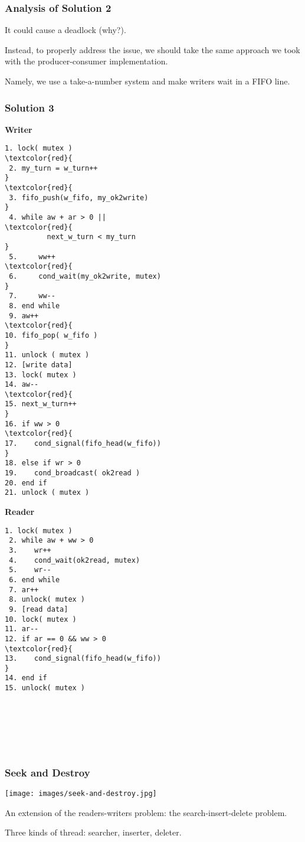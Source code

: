 \begin{frame}
	\frametitle{Analysis of Solution 2}

	It could cause a deadlock (why?).


	Instead, to properly address the issue, we should take the same approach we took with the producer-consumer implementation.

	Namely, we use a \alert{take-a-number} system and make writers wait in a FIFO line.

\end{frame}

\begin{frame}[fragile]
	\frametitle{Solution 3}

	\begin{multicols}{2}
		\footnotesize
		\textbf{Writer}
		\begin{Verbatim}[commandchars=\\\{\}]
 1. lock( mutex )
\textcolor{red}{
 2. my_turn = w_turn++
}
\textcolor{red}{
 3. fifo_push(w_fifo, my_ok2write)
}
 4. while aw + ar > 0 ||
\textcolor{red}{
          next_w_turn < my_turn
}
 5.     ww++
\textcolor{red}{
 6.     cond_wait(my_ok2write, mutex)
}
 7.     ww--
 8. end while
 9. aw++
\textcolor{red}{
10. fifo_pop( w_fifo )
}
11. unlock ( mutex )
12. [write data]
13. lock( mutex )
14. aw--
\textcolor{red}{
15. next_w_turn++
}
16. if ww > 0
\textcolor{red}{
17.    cond_signal(fifo_head(w_fifo))
}
18. else if wr > 0
19.    cond_broadcast( ok2read )
20. end if
21. unlock ( mutex )
    \end{Verbatim}
    \columnbreak
    \textbf{Reader}
    \begin{Verbatim}[commandchars=\\\{\}]
 1. lock( mutex )
 2. while aw + ww > 0
 3.    wr++
 4.    cond_wait(ok2read, mutex)
 5.    wr--
 6. end while
 7. ar++
 8. unlock( mutex )
 9. [read data]
10. lock( mutex )
11. ar--
12. if ar == 0 && ww > 0
\textcolor{red}{
13.    cond_signal(fifo_head(w_fifo))
}
14. end if
15. unlock( mutex )







    \end{Verbatim}
\end{multicols}
\vspace{-2em}

\end{frame}


\begin{frame}
	\frametitle{Seek and Destroy}

	\begin{center}
		\texttt{[image: images/seek-and-destroy.jpg]}
	\end{center}
	An extension of the readers-writers problem: the search-insert-delete problem.

	Three kinds of thread: searcher, inserter, deleter.

\end{frame}


